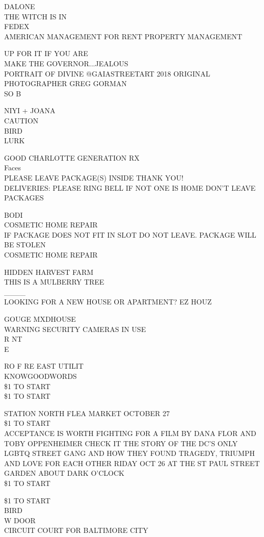 \documentclass[10pt,letterpaper]{article}
\begin{document}
DALONE\\
THE WITCH IS IN\\
FEDEX\\
AMERICAN MANAGEMENT FOR RENT PROPERTY MANAGEMENT

UP FOR IT IF YOU ARE\\
MAKE THE GOVERNOR...JEALOUS\\
PORTRAIT OF DIVINE @GAIASTREETART 2018 ORIGINAL PHOTOGRAPHER GREG GORMAN\\
SO B

NIYI + JOANA\\
CAUTION\\
BIRD\\
LURK

GOOD CHARLOTTE GENERATION RX\\
Faces\\
PLEASE LEAVE PACKAGE(S) INSIDE THANK YOU!\\
DELIVERIES: PLEASE RING BELL IF NOT ONE IS HOME DON'T LEAVE PACKAGES

BODI\\
COSMETIC HOME REPAIR\\
IF PACKAGE DOES NOT FIT IN SLOT DO NOT LEAVE.  PACKAGE WILL BE STOLEN\\
COSMETIC HOME REPAIR

HIDDEN HARVEST FARM\\
THIS IS A MULBERRY TREE\\
\_\_\_\_\\
LOOKING FOR A NEW HOUSE OR APARTMENT?  EZ HOUZ

GOUGE MXDHOUSE\\
WARNING SECURITY CAMERAS IN USE\\
R NT\\
E

RO F RE EAST UTILIT\\
KNOWGOODWORDS\\
\$1 TO START\\
\$1 TO START

STATION NORTH FLEA MARKET OCTOBER 27\\
\$1 TO START\\
ACCEPTANCE IS WORTH FIGHTING FOR A FILM BY DANA FLOR AND TOBY OPPENHEIMER CHECK IT THE STORY OF THE DC'S ONLY LGBTQ STREET GANG AND HOW THEY FOUND TRAGEDY, TRIUMPH AND LOVE FOR EACH OTHER RIDAY OCT 26 AT THE ST PAUL STREET GARDEN ABOUT DARK O'CLOCK\\
\$1 TO START

\$1 TO START\\
BIRD\\
W DOOR\\
CIRCUIT COURT FOR BALTIMORE CITY
\end{document}
